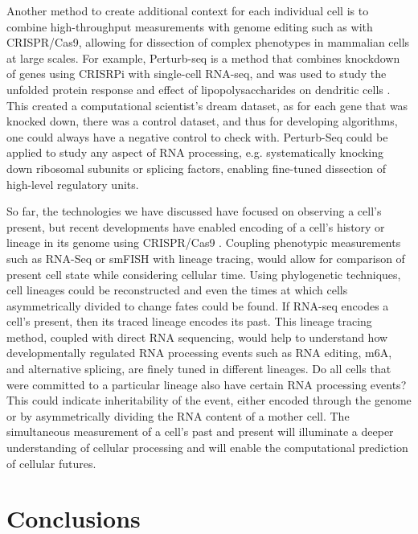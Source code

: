 Another method to create additional context for each individual cell is to combine high-throughput measurements with genome editing such as with CRISPR/Cas9, allowing for dissection of complex phenotypes in mammalian cells at large scales. For example, Perturb-seq is a method that combines knockdown of genes using CRISRPi with single-cell RNA-seq, and was used to study the unfolded protein response \cite{Adamson2016-nu} and effect of lipopolysaccharides on dendritic cells \cite{Dixit2016-sa}. This created a computational scientist's dream dataset, as for each gene that was knocked down, there was a control dataset, and thus for developing algorithms, one could always have a negative control to check with. Perturb-Seq could be applied to study any aspect of RNA processing, e.g. systematically knocking down ribosomal subunits or splicing factors, enabling fine-tuned dissection of high-level regulatory units.

So far, the technologies we have discussed have focused on observing a cell's present, but recent developments have enabled encoding of a cell's history or lineage in its genome using CRISPR/Cas9 \cite{Frieda2017-vv,McKenna2016-yi}. Coupling phenotypic measurements such as RNA-Seq or smFISH with lineage tracing, would allow for comparison of present cell state while considering cellular time. Using phylogenetic techniques, cell lineages could be reconstructed and even the times at which cells asymmetrically divided to change fates could be found. If RNA-seq encodes a cell's present, then its traced lineage encodes its past. This lineage tracing method, coupled with direct RNA sequencing, would help to understand how developmentally regulated RNA processing events such as RNA editing, m6A, and alternative splicing, are finely tuned in different lineages. Do all cells that were committed to a particular lineage also have certain RNA processing events? This could indicate inheritability of the event, either encoded through the genome or by asymmetrically dividing the RNA content of a mother cell. The simultaneous measurement of a cell's past and present will illuminate a deeper understanding of cellular processing and will enable the computational prediction of cellular futures.

\section{Conclusions}

